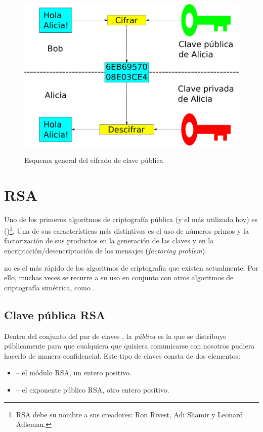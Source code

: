  \begin{figure}[ht]
   \centering
   \includegraphics[scale=0.5]{Figures/PublicKeyEncryption}
   \decoRule
   \caption[Cifrado de clave pública (Esquema)]{Esquema general del cifrado de clave pública} \emph{\parencite{Reference5}}
   \label{fig:PublicKeyEncryption}
 \end{figure}


 \section{RSA}

 Uno de los primeros algoritmos de criptografía pública (y el más utilizado hoy) es  ()\footnote{RSA debe su nombre a sus creadores: Ron Rivest, Adi Shamir y Leonard Adleman.}.
 Una de sus características más distintivas es el uso de números primos y la factorización de sus productos en la generación de las claves y en la encriptación/desencriptación de los mensajes (\emph{factoring problem}).

  no es el más rápido de los algoritmos de criptografía que existen actualmente. Por ello, muchas veces se recurre a su uso en conjunto con otros algoritmos de criptografía simétrica, como . \emph{\parencite{Reference9}}

 \subsection{Clave pública RSA}

 Dentro del conjunto del par de claves , la \emph{pública} es la que se distribuye públicamente para que cualquiera que quisiera comunicarse con nosotros pudiera hacerlo de manera confidencial.
 Este tipo de claves consta de dos elementos:
 \begin{itemize}
 \item {} -- el módulo RSA, un entero positivo.
 \item {} -- el exponente público RSA, otro entero positivo.
 \end{itemize}


